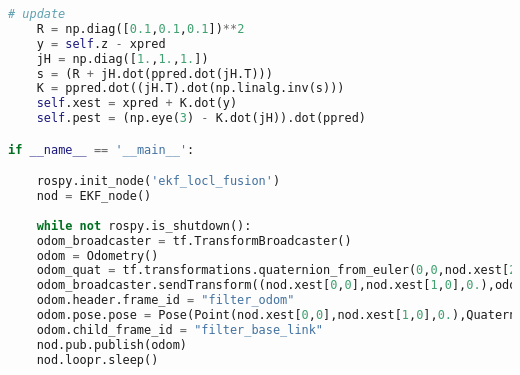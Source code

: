 \begin{appendices}
\begin{lstlisting}[language=Python]
	# update
	R = np.diag([0.1,0.1,0.1])**2
	y = self.z - xpred
	jH = np.diag([1.,1.,1.])
	s = (R + jH.dot(ppred.dot(jH.T)))
	K = ppred.dot((jH.T).dot(np.linalg.inv(s)))
	self.xest = xpred + K.dot(y)
	self.pest = (np.eye(3) - K.dot(jH)).dot(ppred)

if __name__ == '__main__':

	rospy.init_node('ekf_locl_fusion')
	nod = EKF_node()
	
	while not rospy.is_shutdown():
	odom_broadcaster = tf.TransformBroadcaster()
	odom = Odometry()
	odom_quat = tf.transformations.quaternion_from_euler(0,0,nod.xest[2,0])
	odom_broadcaster.sendTransform((nod.xest[0,0],nod.xest[1,0],0.),odom_quat,rospy.Time.now(),"base_link_filter","odom_filter")
	odom.header.frame_id = "filter_odom"
	odom.pose.pose = Pose(Point(nod.xest[0,0],nod.xest[1,0],0.),Quaternion(*odom_quat))
	odom.child_frame_id = "filter_base_link"
	nod.pub.publish(odom)
	nod.loopr.sleep()
\end{lstlisting}
\end{appendices}
